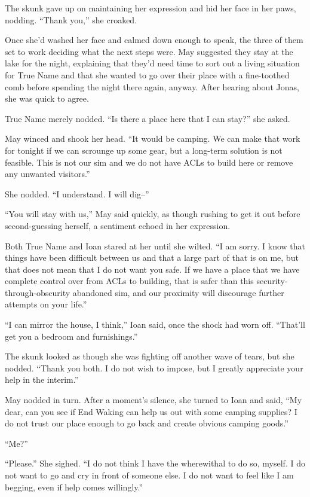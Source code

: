 The skunk gave up on maintaining her expression and hid her face in her paws, nodding. ``Thank you,'' she croaked.

Once she'd washed her face and calmed down enough to speak, the three of them set to work deciding what the next steps were. May suggested they stay at the lake for the night, explaining that they'd need time to sort out a living situation for True Name and that she wanted to go over their place with a fine-toothed comb before spending the night there again, anyway. After hearing about Jonas, she was quick to agree.

True Name merely nodded. ``Is there a place here that I can stay?'' she asked.

May winced and shook her head. ``It would be camping. We can make that work for tonight if we can scrounge up some gear, but a long-term solution is not feasible. This is not our sim and we do not have ACLs to build here or remove any unwanted visitors.''

She nodded. ``I understand. I will dig--''

``You will stay with us,'' May said quickly, as though rushing to get it out before second-guessing herself, a sentiment echoed in her expression.

Both True Name and Ioan stared at her until she wilted. ``I am sorry. I know that things have been difficult between us and that a large part of that is on me, but that does not mean that I do not want you safe. If we have a place that we have complete control over from ACLs to building, that is safer than this security-through-obscurity abandoned sim, and our proximity will discourage further attempts on your life.''

``I can mirror the house, I think,'' Ioan said, once the shock had worn off. ``That'll get you a bedroom and furnishings.''

The skunk looked as though she was fighting off another wave of tears, but she nodded. ``Thank you both. I do not wish to impose, but I greatly appreciate your help in the interim.''

May nodded in turn. After a moment's silence, she turned to Ioan and said, ``My dear, can you see if End Waking can help us out with some camping supplies? I do not trust our place enough to go back and create obvious camping goods.''

``Me?''

``Please.'' She sighed. ``I do not think I have the wherewithal to do so, myself. I do not want to go and cry in front of someone else. I do not want to feel like I am begging, even if help comes willingly.''

